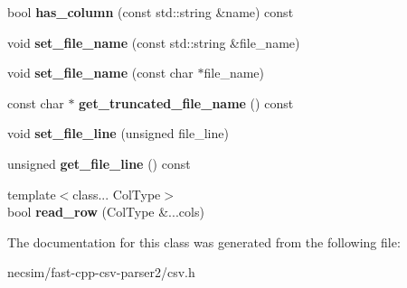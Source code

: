 \begin{DoxyCompactItemize}
\item 
bool {\bfseries has\+\_\+column} (const std\+::string \&name) const \hypertarget{classio_1_1_c_s_v_reader_a67c1d0d621fc0e4b8021d805dae9c176}{}\label{classio_1_1_c_s_v_reader_a67c1d0d621fc0e4b8021d805dae9c176}

\item 
void {\bfseries set\+\_\+file\+\_\+name} (const std\+::string \&file\+\_\+name)\hypertarget{classio_1_1_c_s_v_reader_a4096c1e43a4fba2b4f5ae21d047b5fbc}{}\label{classio_1_1_c_s_v_reader_a4096c1e43a4fba2b4f5ae21d047b5fbc}

\item 
void {\bfseries set\+\_\+file\+\_\+name} (const char $\ast$file\+\_\+name)\hypertarget{classio_1_1_c_s_v_reader_a5f1dc083a8fa8661f5ecdcf6aebc7b24}{}\label{classio_1_1_c_s_v_reader_a5f1dc083a8fa8661f5ecdcf6aebc7b24}

\item 
const char $\ast$ {\bfseries get\+\_\+truncated\+\_\+file\+\_\+name} () const \hypertarget{classio_1_1_c_s_v_reader_a7802939e9c108c4acfc7101baf52da95}{}\label{classio_1_1_c_s_v_reader_a7802939e9c108c4acfc7101baf52da95}

\item 
void {\bfseries set\+\_\+file\+\_\+line} (unsigned file\+\_\+line)\hypertarget{classio_1_1_c_s_v_reader_a1303bd6a2eb0d3d7c743212e52839ac4}{}\label{classio_1_1_c_s_v_reader_a1303bd6a2eb0d3d7c743212e52839ac4}

\item 
unsigned {\bfseries get\+\_\+file\+\_\+line} () const \hypertarget{classio_1_1_c_s_v_reader_aeea0f1ab9791a7dd3c699398c85edfaa}{}\label{classio_1_1_c_s_v_reader_aeea0f1ab9791a7dd3c699398c85edfaa}

\item 
{\footnotesize template$<$class... Col\+Type$>$ }\\bool {\bfseries read\+\_\+row} (Col\+Type \&...cols)\hypertarget{classio_1_1_c_s_v_reader_a61ecdcaa62c024bf97c4e5d133478d7e}{}\label{classio_1_1_c_s_v_reader_a61ecdcaa62c024bf97c4e5d133478d7e}

\end{DoxyCompactItemize}


The documentation for this class was generated from the following file\+:\begin{DoxyCompactItemize}
\item 
necsim/fast-\/cpp-\/csv-\/parser2/csv.\+h\end{DoxyCompactItemize}
